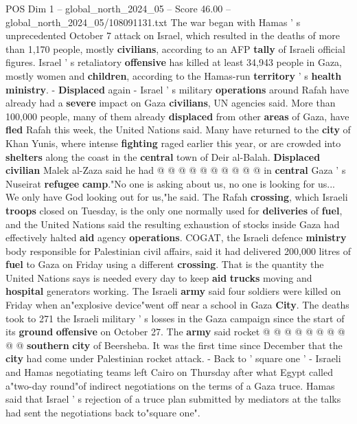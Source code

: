 \begin{textsample}{POS Dim 1 – global\_north\_2024\_05 – Score 46.00 – global\_north\_2024\_05/108091131.txt}
The war began with Hamas ' s unprecedented October 7 attack on Israel, which resulted in the deaths of more than 1,170 people, mostly \textbf{civilians}, according to an AFP \textbf{tally} of Israeli official figures.
Israel ' s retaliatory \textbf{offensive} has killed at least 34,943 people in Gaza, mostly women and \textbf{children}, according to the Hamas-run \textbf{territory} ' s \textbf{health} \textbf{ministry}. - \textbf{Displaced} again - Israel ' s military \textbf{operations} around Rafah have already had a \textbf{severe} impact on Gaza \textbf{civilians}, UN agencies said.
More than 100,000 people, many of them already \textbf{displaced} from other \textbf{areas} of Gaza, have \textbf{fled} Rafah this week, the United Nations said.
Many have returned to the \textbf{city} of Khan Yunis, where intense \textbf{fighting} raged earlier this year, or are crowded into \textbf{shelters} along the coast in the \textbf{central} town of Deir al-Balah. \textbf{Displaced} \textbf{civilian} Malek al-Zaza said he had @ @ @ @ @ @ @ @ @ @ in \textbf{central} Gaza ' s Nuseirat \textbf{refugee} \textbf{camp}."No one is asking about us, no one is looking for us...
We only have God looking out for us,"he said.
The Rafah \textbf{crossing}, which Israeli \textbf{troops} closed on Tuesday, is the only one normally used for \textbf{deliveries} of \textbf{fuel}, and the United Nations said the resulting exhaustion of stocks inside Gaza had effectively halted \textbf{aid} agency \textbf{operations}.
COGAT, the Israeli defence \textbf{ministry} body responsible for Palestinian civil affairs, said it had delivered 200,000 litres of \textbf{fuel} to Gaza on Friday using a different \textbf{crossing}.
That is the quantity the United Nations says is needed every day to keep \textbf{aid} \textbf{trucks} moving and \textbf{hospital} generators working.
The Israeli \textbf{army} said four soldiers were killed on Friday when an"explosive device"went off near a school in Gaza \textbf{City}.
The deaths took to 271 the Israeli military ' s losses in the Gaza campaign since the start of its \textbf{ground} \textbf{offensive} on October 27.
The \textbf{army} said rocket @ @ @ @ @ @ @ @ @ @ \textbf{southern} \textbf{city} of Beersheba.
It was the first time since December that the \textbf{city} had come under Palestinian rocket attack. - Back to ' square one ' - Israeli and Hamas negotiating teams left Cairo on Thursday after what Egypt called a"two-day round"of indirect negotiations on the terms of a Gaza truce.
Hamas said that Israel ' s rejection of a truce plan submitted by mediators at the talks had sent the negotiations back to"square one".

\end{textsample}
